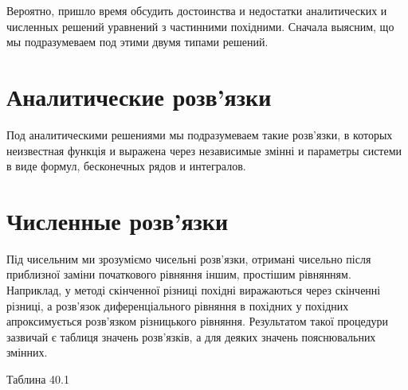 \documentclass[
  ukrainian,
]{article}
\begin{document}
Вероятно, пришло время обсудить достоинства и недостатки аналитических и
численных решений уравнений з частинними похідними. Сначала выясним, що
мы подразумеваем под этими двумя типами решений.

\section{Аналитические
розв'язки}\label{ux430ux43dux430ux43bux438ux442ux438ux447ux435ux441ux43aux438ux435-ux440ux43eux437ux432ux44fux437ux43aux438}

Под аналитическими решениями мы подразумеваем такие розв'язки, в которых
неизвестная функція и выражена через независимые змінні и параметры
системи в виде формул, бесконечных рядов и интегралов.

\section{Численные
розв'язки}\label{ux447ux438ux441ux43bux435ux43dux43dux44bux435-ux440ux43eux437ux432ux44fux437ux43aux438}

Під чисельним ми зрозуміємо чисельні розв'язки, отримані чисельно після
приблизної заміни початкового рівняння іншим, простішим рівнянням.
Наприклад, у методі скінченної різниці похідні виражаються через
скінченні різниці, а розв'язок диференціального рівняння в похідних у
похідних апроксимується розв'язком різницького рівняння. Результатом
такої процедури зазвичай є таблиця значень розв'язків, а для деяких
значень пояснювальних змінних.

Таблина 40.1
\end{document}
